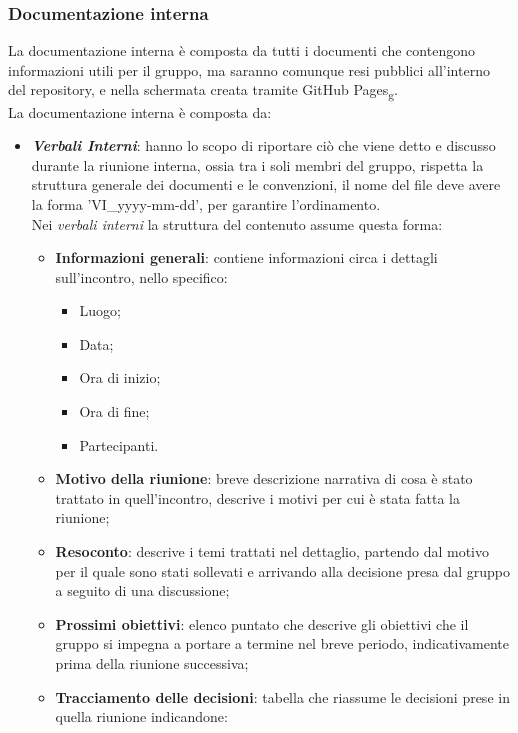         \subsubsection{Documentazione interna}
        La documentazione interna è composta da tutti i documenti che contengono informazioni utili per il gruppo,  
        ma saranno comunque resi pubblici all'interno del repository, e nella schermata creata tramite GitHub Pages\textsubscript{g}.\\
        La documentazione interna è composta da:
        \begin{itemize}
            \item \textit{\textbf{Verbali Interni}}: hanno lo scopo di riportare ciò che viene detto e discusso durante la riunione interna, ossia tra i soli membri del gruppo, 
            rispetta la struttura generale dei documenti e le convenzioni, il nome del file deve avere la forma 'VI\_yyyy-mm-dd', per garantire l'ordinamento.
            \\Nei \textit{verbali interni} la struttura del contenuto assume questa forma:
            \begin{itemize}
                \item \textbf{Informazioni generali}: contiene informazioni circa i dettagli sull'incontro, nello specifico:
                \begin{itemize}
                    \item Luogo;
                    \item Data;
                    \item Ora di inizio;
                    \item Ora di fine;
                    \item Partecipanti.
                \end{itemize}
                \item \textbf{Motivo della riunione}: breve descrizione narrativa di cosa è stato trattato in quell'incontro, descrive i motivi per cui è stata fatta la riunione;
                \item \textbf{Resoconto}: descrive i temi trattati nel dettaglio, partendo dal motivo per il quale sono stati sollevati e arrivando alla decisione presa dal gruppo a seguito di una discussione;
                \item \textbf{Prossimi obiettivi}: elenco puntato che descrive gli obiettivi che il gruppo si impegna a portare a termine nel breve periodo, indicativamente prima della riunione successiva;
                \item \textbf{Tracciamento delle decisioni}: tabella che riassume le decisioni prese in quella riunione indicandone:

\end{itemize}
\end{itemize}
